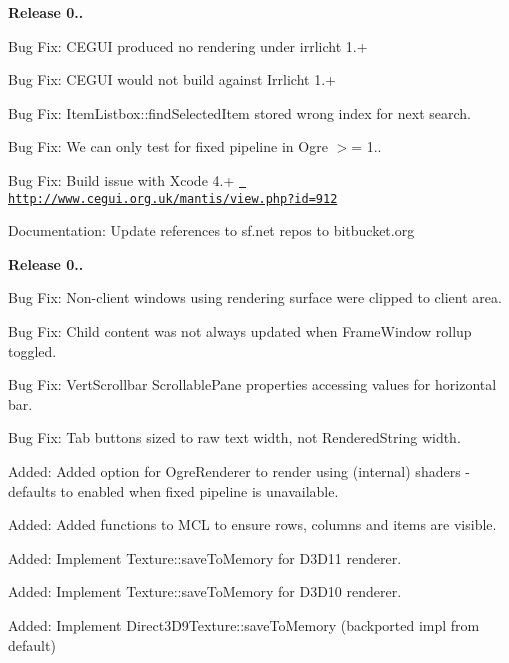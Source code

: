 {\bfseries{Release 0..}}
\begin{DoxyItemize}
\item Bug Fix\+: C\+E\+G\+UI produced no rendering under irrlicht 1.+
\item Bug Fix\+: C\+E\+G\+UI would not build against Irrlicht 1.+
\item Bug Fix\+: Item\+Listbox\+::find\+Selected\+Item stored wrong index for \textquotesingle{}next\textquotesingle{} search.
\item Bug Fix\+: We can only test for fixed pipeline in Ogre $>$= 1..
\item Bug Fix\+: Build issue with Xcode 4.+ \href{http://www.cegui.org.uk/mantis/view.php?id=912}{\texttt{ http\+://www.\+cegui.\+org.\+uk/mantis/view.\+php?id=912}}
\item Documentation\+: Update references to sf.\+net repos to bitbucket.\+org
\end{DoxyItemize}

{\bfseries{Release 0..}}
\begin{DoxyItemize}
\item Bug Fix\+: Non-\/client windows using rendering surface were clipped to client area.
\item Bug Fix\+: Child content was not always updated when Frame\+Window rollup toggled.
\item Bug Fix\+: Vert\+Scrollbar Scrollable\+Pane properties accessing values for horizontal bar.
\item Bug Fix\+: Tab buttons sized to raw text width, not Rendered\+String width.
\item Added\+: Added option for Ogre\+Renderer to render using (internal) shaders -\/ defaults to enabled when fixed pipeline is unavailable.
\item Added\+: Added functions to M\+CL to ensure rows, columns and items are visible.
\item Added\+: Implement Texture\+::save\+To\+Memory for D3\+D11 renderer.
\item Added\+: Implement Texture\+::save\+To\+Memory for D3\+D10 renderer.
\item Added\+: Implement Direct3\+D9\+Texture\+::save\+To\+Memory (backported impl from default)
\end{DoxyItemize}

